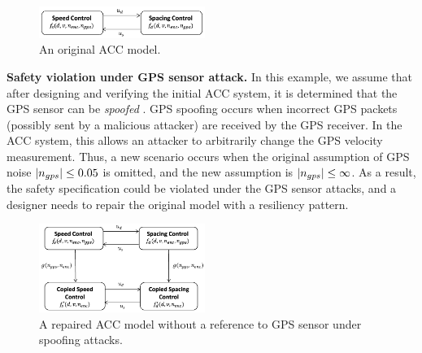 %
%
%
\begin{figure}[tbp]%
	\centering%
		\includegraphics[width=0.48\textwidth]{image/acc_abstract_model}%
	\caption{An original ACC model.}%
\end{figure}%


\vspace{0.5em}
\noindent
{\bf Safety violation under GPS sensor attack.}
%
%
In this example, we assume that after designing and verifying the initial ACC system, it is determined that the GPS sensor can be \emph{spoofed} \cite{tippenhauer2011requirements, kerns2014unmanned}. GPS spoofing occurs when incorrect GPS packets (possibly sent by a malicious attacker) are received by the GPS receiver. In the ACC system, this allows an attacker to arbitrarily change the GPS velocity measurement. 
%
Thus, a new scenario occurs when the original assumption of GPS noise \eg $|n_{gps}| \leq 0.05$ is omitted, and the new assumption is $|n_{gps}| \leq \infty$.
As a result, the safety specification could be violated under the GPS sensor attacks, and a designer needs to repair the original model with a resiliency pattern. 

\begin{figure}[t!]%
	\centering%
		\includegraphics[width=0.48\textwidth]{image/acc_abstract_model_pat1}%
	\caption{A repaired ACC model without a reference to GPS sensor under spoofing attacks.}%
\end{figure}%


